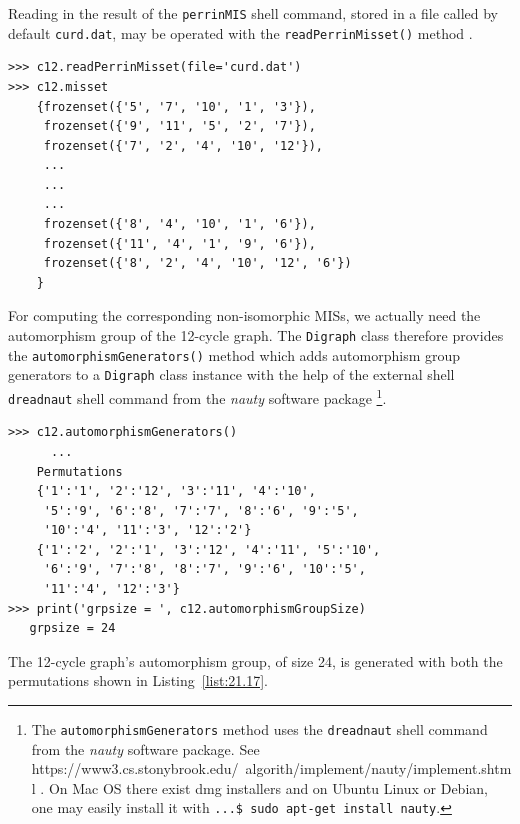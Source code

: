 Reading in the result of the \texttt{perrinMIS} shell command, stored in a file called by default \texttt{curd.dat}, may be operated with the \texttt{readPerrinMisset()} method .
\begin{lstlisting}
>>> c12.readPerrinMisset(file='curd.dat')
>>> c12.misset
    {frozenset({'5', '7', '10', '1', '3'}),
     frozenset({'9', '11', '5', '2', '7'}),
     frozenset({'7', '2', '4', '10', '12'}),
     ...
     ...
     ...
     frozenset({'8', '4', '10', '1', '6'}),
     frozenset({'11', '4', '1', '9', '6'}),
     frozenset({'8', '2', '4', '10', '12', '6'})
    }
\end{lstlisting}

For computing the corresponding non-isomorphic MISs, we actually need the automorphism group of the 12-cycle graph. The \texttt{Digraph} class therefore provides the \texttt{automorphismGenerators()} method which adds automorphism group generators to a \texttt{Digraph} class instance with the help of the external shell \texttt{dreadnaut} shell command from the \emph{nauty} software package \footnote{The \texttt{automorphismGenerators} method uses the \texttt{dreadnaut} shell command from the \emph{nauty} software package. See https://www3.cs.stonybrook.edu/~algorith/implement/nauty/implement.shtml . On Mac OS there exist dmg installers and on Ubuntu Linux or Debian, one may easily install it with \texttt{...\$ sudo apt-get install nauty}.}.
\begin{lstlisting}[caption={Computing the automorphism group generators},label=list:21.17]
>>> c12.automorphismGenerators()
      ...
    Permutations
    {'1':'1', '2':'12', '3':'11', '4':'10',
     '5':'9', '6':'8', '7':'7', '8':'6', '9':'5',
     '10':'4', '11':'3', '12':'2'}
    {'1':'2', '2':'1', '3':'12', '4':'11', '5':'10', 
     '6':'9', '7':'8', '8':'7', '9':'6', '10':'5', 
     '11':'4', '12':'3'}
>>> print('grpsize = ', c12.automorphismGroupSize)
   grpsize = 24
\end{lstlisting}
The 12-cycle graph's automorphism group, of size 24, is generated with both the permutations shown in Listing~\vref{list:21.17}.


